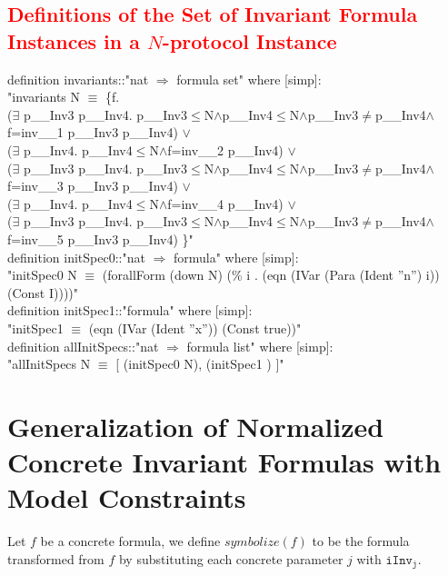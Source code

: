 \documentclass{llncs}
\newcommand\lyj[1]{\textcolor{red}{ #1} }
\def \iInv {iInv}
\begin{document}
\subsection{\lyj{Definitions of  the Set of Invariant Formula Instances in a $N$-protocol Instance} \label{subsec:invariant formula instances }}
definition invariants::"nat $\Rightarrow$ formula set" where [simp]:\\
"invariants N $\equiv$ \{f.\\
($\exists$ p\_\_Inv3 p\_\_Inv4. p\_\_Inv3$\le$N$\wedge$p\_\_Inv4$\le$N$\wedge$p\_\_Inv3$\neq$p\_\_Inv4$\wedge$f=inv\_\_1  p\_\_Inv3 p\_\_Inv4) $\vee$\\
($\exists$ p\_\_Inv4. p\_\_Inv4$\le$N$\wedge$f=inv\_\_2  p\_\_Inv4) $\vee$\\
($\exists$ p\_\_Inv3 p\_\_Inv4. p\_\_Inv3$\le$N$\wedge$p\_\_Inv4$\le$N$\wedge$p\_\_Inv3$\neq$p\_\_Inv4$\wedge$f=inv\_\_3  p\_\_Inv3 p\_\_Inv4) $\vee$\\
($\exists$ p\_\_Inv4. p\_\_Inv4$\le$N$\wedge$f=inv\_\_4  p\_\_Inv4) $\vee$\\
($\exists$ p\_\_Inv3 p\_\_Inv4. p\_\_Inv3$\le$N$\wedge$p\_\_Inv4$\le$N$\wedge$p\_\_Inv3$\neq$p\_\_Inv4$\wedge$f=inv\_\_5  p\_\_Inv3 p\_\_Inv4)
\}"\\
definition initSpec0::"nat $\Rightarrow$ formula" where [simp]:\\
"initSpec0 N $\equiv$ (forallForm (down N) (\% i . (eqn (IVar (Para (Ident ''n'') i)) (Const I))))"\\
definition initSpec1::"formula" where [simp]:\\
"initSpec1  $\equiv$ (eqn (IVar (Ident ''x'')) (Const true))"\\
definition allInitSpecs::"nat $\Rightarrow$ formula list" where [simp]:\\
"allInitSpecs N $\equiv$ [
(initSpec0 N),
(initSpec1 )
]"\\

\section{Generalization of Normalized Concrete Invariant Formulas with Model Constraints}

\begin{definition}
Let  $f$ be a concrete formula, we define $symbolize(f)$ to be the formula transformed from $f$ by substituting each concrete parameter $j$ with $\mathtt{\iInv_j}$.
\end{definition}
\end{document}

